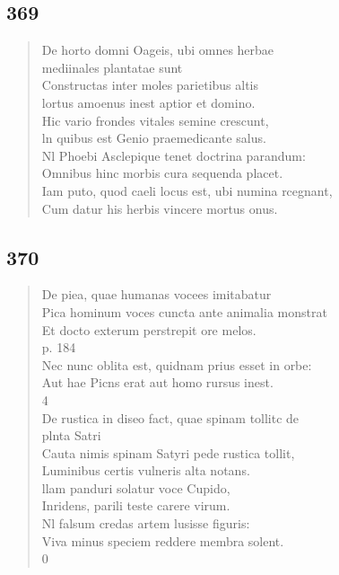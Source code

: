 \documentclass[11pt, a4paper]{report}
\begin{document}
            \subsection*{369}
      \begin{verse}
      De horto domni Oageis, ubi omnes herbae \\ mediinales plantatae sunt \\ Constructas inter moles parietibus altis \\ lortus amoenus inest aptior et domino. \\ Hic vario frondes vitales semine crescunt, \\ ln quibus est Genio praemedicante salus. \\ Nl Phoebi Asclepique tenet doctrina parandum: \\ Omnibus hinc morbis cura sequenda placet. \\ Iam puto, quod caeli locus est, ubi numina rcegnant, \\ Cum datur his herbis vincere mortus onus. \\ 
      \end{verse}
  
            \subsection*{370}
      \begin{verse}
      De piea, quae humanas vocees imitabatur \\ Pica hominum voces cuncta ante animalia monstrat \\ Et docto exterum perstrepit ore melos. \\ p. 184 \\ 
        ﻿\pagebreak 
    Nec nunc oblita est, quidnam prius esset in orbe: \\ Aut hae Picns erat aut homo rursus inest. \\ 4 \\ De rustica in diseo fact, quae spinam tollitc de \\ plnta Satri \\ Cauta nimis spinam Satyri pede rustica tollit, \\ Luminibus certis vulneris alta notans. \\ llam panduri solatur voce Cupido, \\ Inridens, parili teste carere virum. \\ Nl falsum credas artem lusisse figuris: \\ Viva minus speciem reddere membra solent. \\ 0 \\ 
      \end{verse}
  
\end{document}
